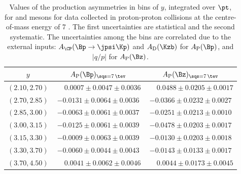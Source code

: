 \begin{table}
\caption{Values of the production asymmetries in bins of $y$, integrated over $\pt$, for \Bp and \Bz mesons for data collected in proton-proton collisions at the centre-of-mass energy of 7 \tev. The first uncertainties are statistical and the second systematic. The uncertainties among the bins are correlated due to the external inputs: $A_{\CP}(\Bp\to\jpsi\Kp)$ and $A_{\rm D}(\Kzb)$ for $A_{\rm P}(\Bp)$, and $|q/p|$ for $A_{\rm P}(\Bz)$. }
\label{tab:AP_BpB0_2011_eta}
\begin{center}
\begin{tabular}{c|c|c}
$y$& $A_{\rm P}(\Bp)_{\sqs = 7\, \tev}$ & $A_{\rm P}(\Bz)_{\sqs = 7\, \tev}$ \\
\hline
$(2.10,  2.70)  $  &  $  \phantom{-}0.0007  \pm  0.0047  \pm  0.0036  $  &  $  \phantom{-}0.0488  \pm  0.0205  \pm  0.0017  $  \\
$(2.70,  2.85)  $  &  $  -0.0131            \pm  0.0064  \pm  0.0036  $  &  $  -0.0366            \pm  0.0232  \pm  0.0027  $  \\
$(2.85,  3.00)  $  &  $  -0.0063            \pm  0.0061  \pm  0.0037  $  &  $  -0.0251            \pm  0.0213  \pm  0.0010  $  \\
$(3.00,  3.15)  $  &  $  -0.0125            \pm  0.0061  \pm  0.0039  $  &  $  -0.0478            \pm  0.0203  \pm  0.0017  $  \\
$(3.15,  3.30)  $  &  $  -0.0009            \pm  0.0063  \pm  0.0039  $  &  $  -0.0130            \pm  0.0203  \pm  0.0018  $  \\
$(3.30,  3.70)  $  &  $  -0.0060            \pm  0.0044  \pm  0.0043  $  &  $  -0.0143            \pm  0.0133  \pm  0.0017  $  \\
$(3.70,  4.50)  $  &  $  \phantom{-}0.0041  \pm  0.0062  \pm  0.0046  $  &  $  \phantom{-}0.0044  \pm  0.0173  \pm  0.0045  $  \\
\end{tabular}
\end{center}
\end{table}

